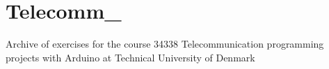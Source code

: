 \chapter{Telecomm\+\_}
\hypertarget{md__r_e_a_d_m_e}{}\label{md__r_e_a_d_m_e}
\label{md__r_e_a_d_m_e_autotoc_md0}%
%


Archive of exercises for the course 34338 Telecommunication programming projects with Arduino at Technical University of Denmark 
